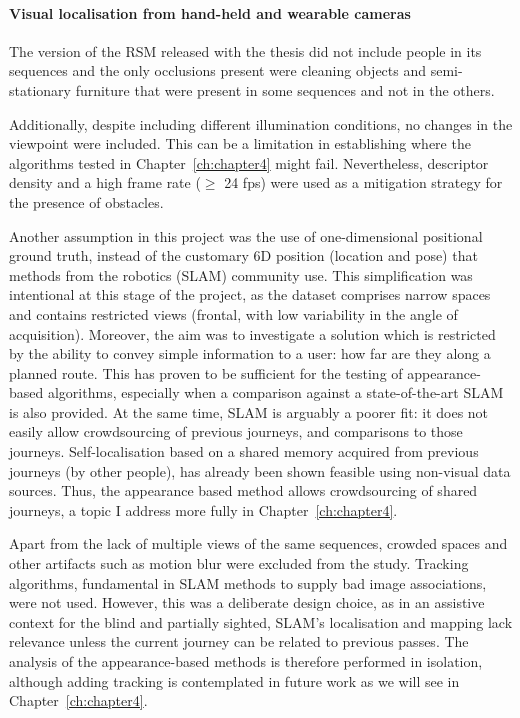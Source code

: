 \paragraph{Visual localisation from hand-held and wearable cameras}

The version of the RSM released with the thesis did not include people in its sequences and the only occlusions present were cleaning objects and semi-stationary furniture that were present in some sequences and not in the others. 

Additionally, despite including different illumination conditions, no changes in the viewpoint were included. This can be a limitation in establishing where the algorithms tested in Chapter~\ref{ch:chapter4} might fail. Nevertheless, descriptor density and a high frame rate ($\geq$ 24 fps) were used as a mitigation strategy for the presence of obstacles.

Another assumption in this project was the use of one-di\-men\-sio\-nal positional ground truth, instead of the customary 6D position (location and pose) that methods from the robotics (SLAM) community use. This simplification was intentional at this stage of the project, as the dataset comprises narrow spaces and contains restricted views (frontal, with low variability in the angle of acquisition). Moreover, the aim was to investigate a solution which is restricted by the ability to convey simple information to a user: how far are they along a planned route. This has proven to be sufficient for the testing of appearance-based algorithms, especially when a comparison against a state-of-the-art SLAM is also provided. At the same time, SLAM is arguably a poorer fit: it does not easily allow crowdsourcing of previous journeys, and comparisons to those journeys.  Self-localisation based on a shared memory acquired from previous journeys (by other people), has already been shown feasible using non-visual data sources. Thus, the appearance based method allows crowdsourcing of shared journeys, a topic I address more fully in Chapter~\ref{ch:chapter4}.

Apart from the lack of multiple views of the same sequences, crowded spaces and other artifacts such as motion blur were excluded from the study. Tracking algorithms, fundamental in SLAM methods to supply bad image associations, were not used. However, this was a deliberate design choice, as in an assistive context for the blind and partially sighted, SLAM's localisation and mapping lack relevance unless the current journey can be related to previous passes. The analysis of the appearance-based methods is therefore performed in isolation, although adding tracking is contemplated in future work as we will see in Chapter~\ref{ch:chapter4}.

